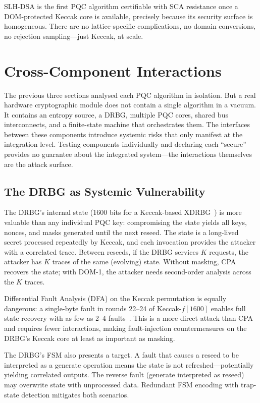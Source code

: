 SLH-DSA is the first PQC algorithm certifiable with SCA resistance once a DOM-protected Keccak core is available, precisely because its security surface is homogeneous.  There are no lattice-specific complications, no domain conversions, no rejection sampling---just Keccak, at scale.


\section{Cross-Component Interactions}
\label{sec:cross-component}

The previous three sections analysed each PQC algorithm in isolation.  But a real hardware cryptographic module does not contain a single algorithm in a vacuum.  It contains an entropy source, a DRBG, multiple PQC cores, shared bus interconnects, and a finite-state machine that orchestrates them.  The interfaces between these components introduce systemic risks that only manifest at the integration level.  Testing components individually and declaring each ``secure'' provides no guarantee about the integrated system---the interactions themselves are the attack surface.

\subsection{The DRBG as Systemic Vulnerability}
\label{subsec:drbg-systemic}

The DRBG's internal state (1600 bits for a Keccak-based XDRBG~\cite{KampanakisDang2023}) is more valuable than any individual PQC key: compromising the state yields all keys, nonces, and masks generated until the next reseed.  The state is a long-lived secret processed repeatedly by Keccak, and each invocation provides the attacker with a correlated trace.  Between reseeds, if the DRBG services $K$ requests, the attacker has $K$ traces of the same (evolving) state.  Without masking, CPA recovers the state; with DOM-1, the attacker needs second-order analysis across the $K$ traces.

Differential Fault Analysis (DFA) on the Keccak permutation is equally dangerous: a single-byte fault in rounds 22--24 of Keccak-$f[1600]$ enables full state recovery with as few as 2--4 faults~\cite{BagheriEtAl2015}.  This is a more direct attack than CPA and requires fewer interactions, making fault-injection countermeasures on the DRBG's Keccak core at least as important as masking.

The DRBG's FSM also presents a target.  A fault that causes a reseed to be interpreted as a generate operation means the state is not refreshed---potentially yielding correlated outputs.  The reverse fault (generate interpreted as reseed) may overwrite state with unprocessed data.  Redundant FSM encoding with trap-state detection mitigates both scenarios.

